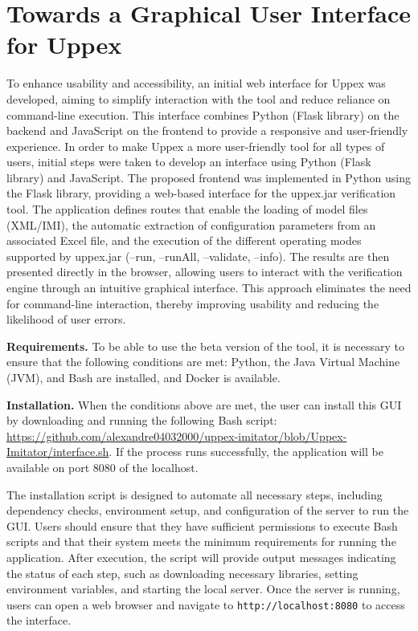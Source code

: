 

\chapter{Towards a Graphical User Interface for Uppex}

To enhance usability and accessibility, an initial web interface for Uppex was developed, aiming to simplify interaction with the tool and reduce reliance on command-line execution. This interface combines Python (Flask library) on the backend and JavaScript on the frontend to provide a responsive and user-friendly experience. In order to make Uppex a more user-friendly tool for all types of users, initial steps were taken to develop an interface using Python (Flask library) and JavaScript. The proposed frontend was implemented in Python using the Flask library, providing a web-based interface for the uppex.jar verification tool. The application defines routes that enable the loading of model files (XML/IMI), the automatic extraction of configuration parameters from an associated Excel file, and the execution of the different operating modes supported by uppex.jar (--run, --runAll, --validate, --info). The results are then presented directly in the browser, allowing users to interact with the verification engine through an intuitive graphical interface. This approach eliminates the need for command-line interaction, thereby improving usability and reducing the likelihood of user errors.
\medskip

\noindent
\textbf{Requirements.} To be able to use the beta version of the tool, it is necessary to ensure that the following conditions are met: Python, the Java Virtual Machine (JVM), and Bash are installed, and Docker is available.

\medskip

\noindent
\textbf{Installation.} When the conditions above are met, the user can install this GUI by downloading and running the following Bash script:
\url{https://github.com/alexandre04032000/uppex-imitator/blob/Uppex-Imitator/interface.sh}. 
If the process runs successfully, the application will be available on port 8080 of the localhost.

The installation script is designed to automate all necessary steps, including dependency checks, environment setup, and configuration of the server to run the GUI. Users should ensure that they have sufficient permissions to execute Bash scripts and that their system meets the minimum requirements for running the application. After execution, the script will provide output messages indicating the status of each step, such as downloading necessary libraries, setting environment variables, and starting the local server. Once the server is running, users can open a web browser and navigate to \texttt{http://localhost:8080}
 to access the interface.

